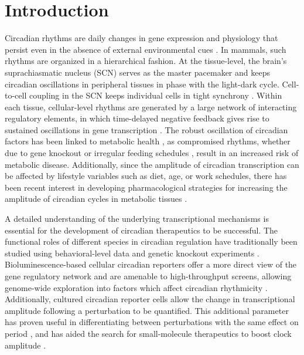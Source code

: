 \documentclass[11pt, letterpaper]{article}
\begin{document}
\section*{Introduction}

Circadian rhythms are daily changes in gene expression and physiology that persist even in the absence of external environmental cues \cite{Herzog2007}.
In mammals, such rhythms are organized in a hierarchical fashion.
At the tissue-level, the brain's suprachiasmatic nucleus (SCN) serves as the master pacemaker and keeps circadian oscillations in peripheral tissues in phase with the light-dark cycle.
Cell-to-cell coupling in the SCN keeps individual cells in tight synchrony \cite{Herzog2004}. 
Within each tissue, cellular-level rhythms are generated by a large network of interacting regulatory elements, in which time-delayed negative feedback gives rise to sustained oscillations in gene transcription \cite{Ueda2005}.
The robust oscillation of circadian factors has been linked to metabolic health \cite{Bass2012}, as compromised rhythms, whether due to gene knockout \cite{Marcheva2010} or irregular feeding schedules \cite{Hatori2012}, result in an increased risk of metabolic disease.
Additionally, since the amplitude of circadian transcription can be affected by lifestyle variables such as diet, age, or work schedules, there has been recent interest in developing pharmacological strategies for increasing the amplitude of circadian cycles in metabolic tissues \cite{Chen2013}.

A detailed understanding of the underlying transcriptional mechanisms is essential for the development of circadian therapeutics to be successful. 
The functional roles of different species in circadian regulation have traditionally been studied using behavioral-level data and genetic knockout experiments \cite{Vitaterna1994}.
Bioluminescence-based cellular circadian reporters offer a more direct view of the gene regulatory network \cite{Balsalobre1998} and are amenable to high-throughput screens, allowing genome-wide exploration into factors which affect circadian rhythmicity \cite{Zhang2009}.
Additionally, cultured circadian reporter cells allow the change in transcriptional amplitude following a perturbation to be quantified.
This additional parameter has proven useful in differentiating between perturbations with the same effect on period \cite{St.John2014}, and has aided the search for small-molecule therapeutics to boost clock amplitude \cite{Chen2013}.
\end{document}
